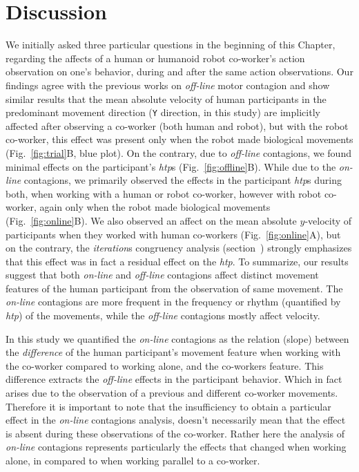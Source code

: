 \clearpage

\section{Discussion}

We initially asked three particular questions in the beginning of this Chapter, regarding the affects of a human or humanoid robot co-worker's action observation on one's behavior, during and after the same action observations. Our findings agree with the previous works on \textit{off-line} motor contagion and show similar results that the mean absolute velocity of human participants in the predominant movement direction (\texttt{Y} direction, in this study) are implicitly affected after observing a co-worker (both human and robot), but with the robot co-worker, this effect was present only when the robot made biological movements (Fig.~\ref{fig:trial}B, blue plot). On the contrary, due to \textit{off-line} contagions, we found minimal effects on the participant's {\it htp}s (Fig.~\ref{fig:offline}B). While due to the \textit{on-line} contagions, we primarily observed the effects in the participant {\it htp}s during both, when working with a human or robot co-worker, however with robot co-worker, again only when the robot made biological movements (Fig.~\ref{fig:online}B). We also observed an affect on the mean absolute $y$-velocity of participants when they worked with human co-workers (Fig.~\ref{fig:online}A), but on the contrary, the \textit{iteration}s congruency analysis (section~) strongly emphasizes that this effect was in fact a residual effect on the {\it htp}. To summarize, our results suggest that both \textit{on-line} and \textit{off-line} contagions affect distinct movement features of the human participant from the observation of same movement. The \textit{on-line} contagions are more frequent in the frequency or rhythm (quantified by {\it htp}) of the movements, while the \textit{off-line} contagions mostly affect velocity.

In this study we quantified the \textit{on-line} contagions as the relation (slope) between the \textit{difference} of the human participant's movement feature when working with the co-worker compared to working alone, and the co-workers feature. This difference extracts the \textit{off-line} effects in the participant behavior. Which in fact arises due to the observation of a previous and different co-worker movements. Therefore it is important to note that the insufficiency to obtain a particular effect in the \textit{on-line} contagions analysis, doesn't necessarily mean that the effect is absent during these observations of the co-worker. Rather here the analysis of \textit{on-line} contagions represents particularly the effects that changed when working alone, in compared to when working parallel to a co-worker.

